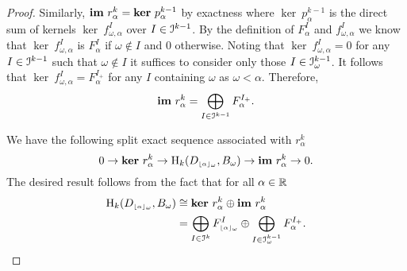 \begin{proof}
  Similarly, $\mathbf{im}~r_\alpha^k = \mathbf{ker}~p_\alpha^{k-1}$ by exactness where $\ker~p_\alpha^{k-1}$ is the direct sum of kernels $\ker~f_{\omega,\alpha}^I$ over $I\in\mathcal{I}^{k-1}$.
  By the definition of $F_\alpha^I$ and $f_{\omega,\alpha}^I$ we know that $\ker~f_{\omega,\alpha}^I$ is $F_\alpha^I$ if $\omega\notin I$ and $0$ otherwise.
  Noting that $\ker~f_{\omega,\alpha}^I = 0$ for any $I\in \mathcal{I}^{k-1}$ such that $\omega\notin I$ it suffices to consider only those $I\in \mathcal{I}_\omega^{k-1}$.
  It follows that $\ker~f_{\omega,\alpha}^I = F_\alpha^{I_+}$ for any $I$ containing $\omega$ as $\omega < \alpha$.
  Therefore,
  \[\mathbf{im}~r_\alpha^k = \bigoplus_{I\in\mathcal{I}^{k-1}} F_\alpha^{I_+}.\]

  We have the following split exact sequence associated with $r_\alpha^k$
  \[ 0\to \mathbf{ker}~r_\alpha^k\to \mathrm{H}_k(D_{\scriptscriptstyle \lfloor\alpha\rfloor_{\omega}}, B_\omega)\to\mathbf{im}~r_\alpha^k\to 0.\]
  The desired result follows from the fact that for all $\alpha\in\mathbb{R}$
  \begin{align*}
    \mathrm{H}_k(D_{\scriptscriptstyle \lfloor\alpha\rfloor_{\omega}}, B_\omega) &\cong \mathbf{ker}~r_\alpha^k\oplus \mathbf{im}~r_\alpha^k\\
      &=\bigoplus_{I\in\mathcal{I}^k} F_{\scriptscriptstyle \lfloor\alpha\rfloor_{\omega}}^I\oplus \bigoplus_{I\in\mathcal{I}_\omega^{k-1}} F_\alpha^{I_+}.
  \end{align*}
\end{proof}

